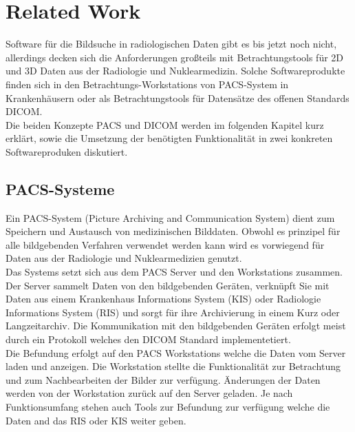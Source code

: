 \section{Related Work}
\label{sec:relatedWork}
Software für die Bildsuche in radiologischen Daten gibt es bis jetzt noch nicht, 
allerdings decken sich die Anforderungen großteils mit Betrachtungstools für 2D und 3D Daten aus der Radiologie und Nuklearmedizin.
Solche Softwareprodukte finden sich in den Betrachtungs-Workstations von PACS-System in Krankenhäusern oder als Betrachtungstools für Datensätze des offenen Standards DICOM.
\\
Die beiden Konzepte PACS und DICOM werden im folgenden Kapitel kurz erklärt, sowie die Umsetzung der benötigten Funktionalität in zwei konkreten Softwareproduken diskutiert.

\subsection{PACS-Systeme}
\label{sec:PACS-Systeme}
Ein PACS-System (Picture Archiving and Communication System) dient zum Speichern und Austausch von medizinischen Bilddaten.
Obwohl es prinzipel für alle bildgebenden Verfahren verwendet werden kann wird es vorwiegend für Daten aus der Radiologie und Nuklearmedizien genutzt.
\\
Das Systems setzt sich aus dem PACS Server und den Workstations zusammen.
Der Server sammelt Daten von den bildgebenden Geräten,
 verknüpft Sie mit Daten aus einem Krankenhaus Informations System (KIS) oder Radiologie Informations System (RIS) und sorgt für ihre Archivierung in einem Kurz oder Langzeitarchiv. 
Die Kommunikation mit den bildgebenden Geräten erfolgt meist durch ein Protokoll welches den DICOM Standard implementetiert.
\\
Die Befundung erfolgt auf den PACS Workstations welche die Daten vom Server laden und anzeigen.
Die Workstation stellte die Funktionalität zur Betrachtung und zum Nachbearbeiten der Bilder zur verfügung.
Änderungen der Daten werden von der Workstation zurück auf den Server geladen.
Je nach Funktionsumfang stehen auch Tools zur Befundung zur verfügung welche die Daten and das RIS oder KIS weiter geben.

